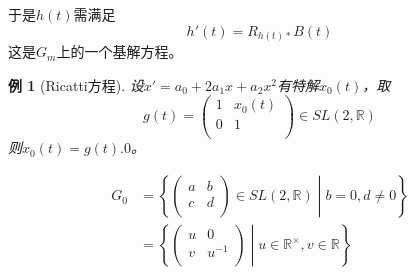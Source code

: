 \documentclass[winfonts,UTF8,c5size,a4paper,fancyhdr,hyperref,titlepage,nocap]{ctexart}
\newtheorem{exa}[thm]{例}
\theoremstyle{definition}
\theoremstyle{remark}
\numberwithin{equation}{subsection}
\newcommand{\Real}{\mathbb{R}}
\begin{document}
于是$h(t)$需满足
\begin{equation*}
h'(t)=R_{h(t)\ast}B(t)
\end{equation*}
这是$G_m$上的一个基解方程。

\begin{exa}[Ricatti方程]
设$x'=a_0+2a_1x+a_2x^2$有特解$x_0(t)$，取
\begin{equation*}
g(t)=\begin{pmatrix}
  1 & x_0(t) \\
  0 & 1 \\
\end{pmatrix}\in SL(2,\Real)
\end{equation*}
则$x_0(t)=g(t).0$。

\begin{align*}
  G_0&=\left\{\begin{pmatrix}
                a & b \\
                c & d \\
              \end{pmatrix}\in SL(2,\Real)
              \middle|b=0,d\neq0\right\}
              \\
       &=\left\{\begin{pmatrix}
                u & 0 \\
                v & u^{-1} \\
              \end{pmatrix}
              \middle|u\in\Real^{\times}, v\in\Real\right\}
\end{align*}


\end{exa}
\end{document}
